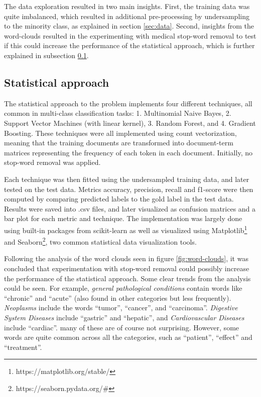 The data exploration resulted in two main insights. First, the training data was quite imbalanced, which resulted in additional pre-processing by undersampling to the minority class, as explained in section \ref{sec:data}. Second, insights from the word-clouds resulted in the experimenting with medical stop-word removal to test if this could increase the performance of the statistical approach, which is further explained in subsection \ref{subsec:method-statistical-approach}.

\subsection{Statistical approach}
\label{subsec:method-statistical-approach}

The statistical approach to the problem implements four different techniques, all common in multi-class classification tasks: 1. Multinomial Naive Bayes, 2. Support Vector Machines (with linear kernel), 3. Random Forest, and 4. Gradient Boosting. These techniques were all implemented using count vectorization, meaning that the training documents are transformed into document-term matrices representing the frequency of each token in each document. Initially, no stop-word removal was applied.

Each technique was then fitted using the undersampled training data, and later tested on the test data. Metrics accuracy, precision, recall and f1-score were then computed by comparing predicted labels to the gold label in the test data. Results were saved into .csv files, and later visualized as confusion matrices and a bar plot for each metric and technique. The implementation was largely done using built-in packages from scikit-learn as well as visualized using Matplotlib\footnote{https://matplotlib.org/stable/} and Seaborn\footnote{https://seaborn.pydata.org/\#}, two common statistical data visualization tools.

Following the analysis of the word clouds seen in figure \ref{fig:word-clouds}, it was concluded that experimentation with stop-word removal could possibly increase the performance of the statistical approach. Some clear trends from the analysis could be seen. For example, \textit{general pathological conditions} contain words like “chronic” and “acute” (also found in other categories but less frequently). \textit{Neoplasms} include the words “tumor”, “cancer”, and “carcinoma”. \textit{Digestive System Diseases} include “gastric” and “hepatic”, and \textit{Cardiovascular Diseases} include “cardiac”. many of these are of course not surprising. However, some words are quite common across all the categories, such as “patient”, “effect” and “treatment”.

